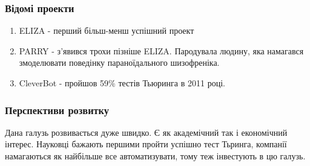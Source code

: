 \documentclass{beamer}
\begin{document}
    \begin{frame}
        \frametitle{Відомі проекти}
        \begin{enumerate}
            \item ELIZA - перший більш-менш успішний проект
            \item PARRY - з'явився трохи пізніше ELIZA. Пародувала людину, яка намагався змоделювати поведінку параноїдального шизофреніка.
            \item CleverBot - пройшов 59\% тестів Тьюринга в 2011 році.
        \end{enumerate}
    \end{frame}

    \begin{frame}
        \frametitle{Перспективи розвитку}
        Дана галузь розвивається дуже швидко. Є як академічний так і економічний інтерес. Науковці бажають першими пройти успішно тест Тьринга, компанії намагаються як найбільше все автоматизувати, тому теж інвестують в цю галузь.
    \end{frame}
\end{document}
